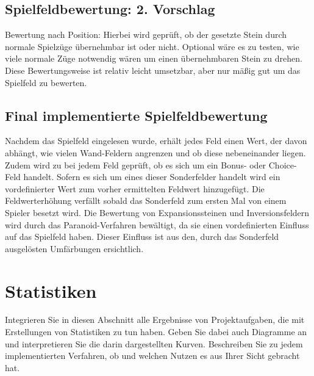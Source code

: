 \documentclass[12pt,a4paper]{article}
\begin{document}
\subsection{Spielfeldbewertung: 2. Vorschlag}
Bewertung nach Position:\newline
Hierbei wird geprüft, ob der gesetzte Stein durch normale Spielzüge übernehmbar ist oder nicht. Optional wäre es zu testen, wie viele normale Züge notwendig wären um einen übernehmbaren Stein zu drehen.\newline 
Diese Bewertungsweise ist relativ leicht umsetzbar, aber nur mäßig gut um das Spielfeld zu bewerten.

\subsection{Final implementierte Spielfeldbewertung}
Nachdem das Spielfeld eingelesen wurde, erhält jedes Feld einen Wert, der davon abhängt, wie vielen Wand-Feldern angrenzen und ob diese nebeneinander liegen. Zudem wird zu bei jedem Feld geprüft, ob es sich um ein Bonus- oder Choice-Feld handelt. Sofern es sich um eines dieser Sonderfelder handelt wird ein vordefinierter Wert zum vorher ermittelten Feldwert hinzugefügt. Die Feldwerterhöhung verfällt sobald das Sonderfeld zum ersten Mal von einem Spieler besetzt wird.\newline %
Die Bewertung von Expansionssteinen und Inversionsfeldern wird durch das Paranoid-Verfahren bewältigt, da sie einen vordefinierten Einfluss auf das Spielfeld haben. Dieser Einfluss ist aus den, durch das Sonderfeld ausgelösten Umfärbungen ersichtlich.
 
\newpage
\section{Statistiken}
Integrieren Sie in diesen Abschnitt alle Ergebnisse von Projektaufgaben, die mit Erstellungen von Statistiken zu tun haben. Geben Sie dabei auch Diagramme an und interpretieren Sie die darin dargestellten Kurven. Beschreiben Sie zu jedem implementierten Verfahren, ob und welchen Nutzen es aus Ihrer Sicht gebracht hat.
\end{document}
